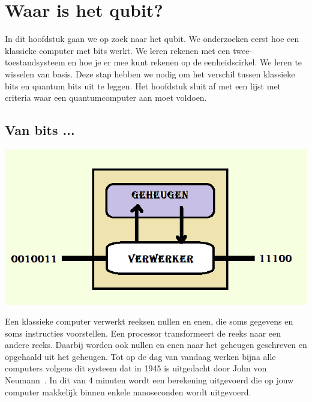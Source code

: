 \documentclass[../../main.tex]{subfiles}
\begin{document}
\onlyinsubfile{
\setcounter{chapter}{1}
}
\notinsubfile{}
%
\chapter{Waar is het qubit?}\label{chap:H2}
In dit hoofdstuk gaan we op zoek naar het qubit. We onderzoeken eerst hoe een klassieke computer met bits werkt. We leren rekenen met een twee-toestandsysteem en hoe je er mee kunt rekenen op de eenheidscirkel. We leren te wisselen van basis. Deze stap hebben we nodig om het verschil tussen klassieke bits en quantum bits uit te leggen. Het hoofdstuk sluit af met een lijst met criteria waar een quantumcomputer aan moet voldoen. 

\section{Van bits ...}\label{sec:vanbit}

\begin{flushleft}
\begin{minipage}{.45\textwidth}
\includegraphics[width=\textwidth]{./img/alu.png}
\end{minipage}%
\hfill
\begin{minipage}{.5\textwidth}
\end{minipage}
\end{flushleft}

Een klassieke computer verwerkt reeksen nullen en enen, die soms gegevens en soms instructies voorstellen. Een processor transformeert de reeks naar een andere reeks. Daarbij worden ook nullen en enen naar het geheugen geschreven en opgehaald uit het geheugen. Tot op de dag van vandaag werken bijna alle computers volgens dit systeem dat in 1945 is uitgedacht door John von Neumann~\cite{Neumann1945}. In dit  van 4 minuten wordt een berekening uitgevoerd die op jouw computer makkelijk binnen enkele nanoseconden wordt uitgevoerd. 
\end{document}
